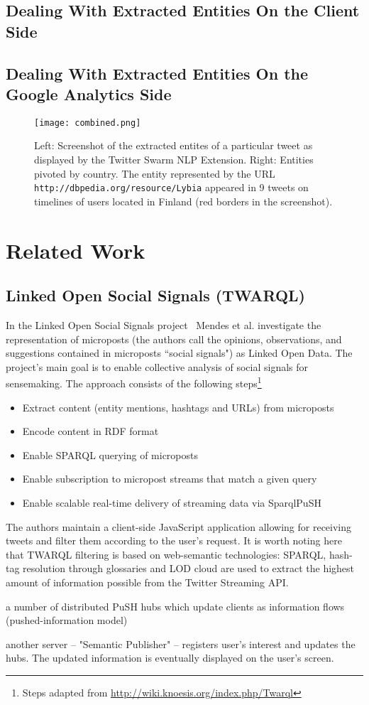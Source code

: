 \documentclass[runningheads,a4paper]{llncs}
\begin{document}
\subsection{Dealing With Extracted Entities On the Client Side}
\subsection{Dealing With Extracted Entities On the Google Analytics Side}

\begin{figure}[h!]
  \centering
  \texttt{[image: combined.png]}
  \caption{Left: Screenshot of the extracted entites of a particular tweet as displayed by the Twitter Swarm NLP Extension. Right: Entities pivoted by country. The entity represented by the URL \texttt{http://dbpedia.org/resource/Lybia} appeared in 9 tweets on timelines of users located in Finland (red borders in the screenshot).}
  \label{fig:dataflow}
\end{figure}

\section{Related Work}

\subsection{Linked Open Social Signals (TWARQL)}
In the Linked Open Social Signals project~\cite{Mendes:LOSS} Mendes et al. investigate the representation of microposts (the authors call the opinions, observations, and suggestions contained in microposts ``social signals") as Linked Open Data. The project's main goal is to enable collective analysis of social signals for sensemaking. The approach consists of the following steps\footnote{Steps adapted from \url{http://wiki.knoesis.org/index.php/Twarql}} 
\begin{itemize}
\item Extract content (entity mentions, hashtags and URLs) from microposts
\item Encode content in RDF format
\item Enable SPARQL querying of microposts
\item Enable subscription to micropost streams that match a given query
\item Enable scalable real-time delivery of streaming data via SparqlPuSH
\end{itemize}
The authors maintain a client-side JavaScript application allowing for receiving tweets and filter them according to the user's request. It is worth noting here that TWARQL filtering is based on web-semantic technologies: SPARQL, hash-tag resolution through glossaries and LOD cloud are used to extract the highest amount of information possible from the Twitter Streaming API.
\item a number of distributed PuSH hubs which update clients as information flows (pushed-information model)
\item another server -- "Semantic Publisher" -- registers user's interest and updates the hubs. The updated information is eventually displayed on the user's screen.
\end{document}
